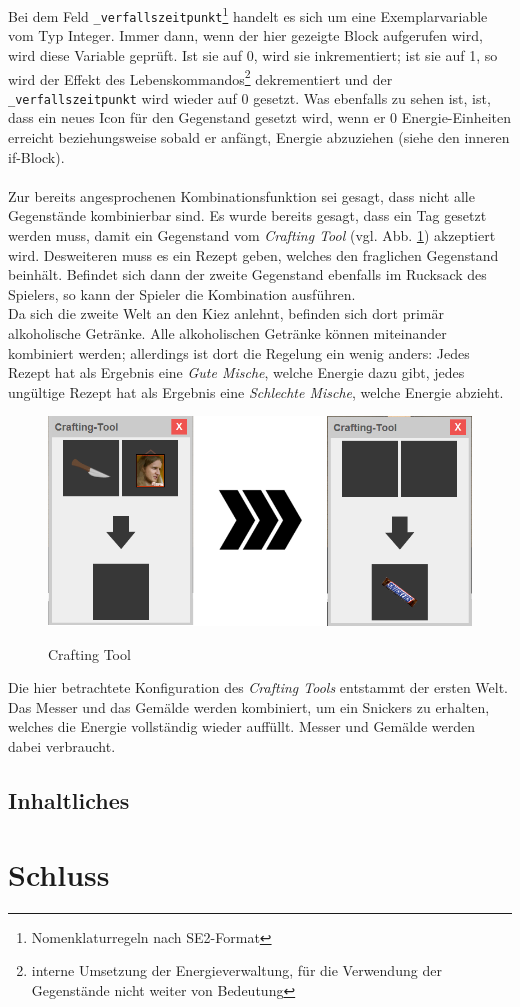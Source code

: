 \documentclass[12pt,twoside]{article}
\theoremstyle{plain}
\theoremstyle{definition}
\theoremstyle{remark}
\begin{document}
Bei dem Feld \texttt{\_verfallszeitpunkt}\footnote{Nomenklaturregeln nach SE2-Format} handelt es sich um eine Exemplarvariable vom Typ Integer.
Immer dann, wenn der hier gezeigte Block aufgerufen wird, wird diese Variable geprüft.
Ist sie auf 0, wird sie inkrementiert; ist sie auf 1, so wird der Effekt des Lebenskommandos\footnote{interne Umsetzung der Energieverwaltung, für die Verwendung der Gegenstände nicht weiter von Bedeutung} dekrementiert und der \texttt{\_verfallszeitpunkt} wird wieder auf 0 gesetzt.
Was ebenfalls zu sehen ist, ist, dass ein neues Icon für den Gegenstand gesetzt wird, wenn er 0 Energie-Einheiten erreicht beziehungsweise sobald er anfängt, Energie abzuziehen (siehe den inneren if-Block).\\
\\
Zur bereits angesprochenen Kombinationsfunktion sei gesagt, dass nicht alle Gegenstände kombinierbar sind.
Es wurde bereits gesagt, dass ein Tag gesetzt werden muss, damit ein Gegenstand vom \textit{Crafting Tool} (vgl. Abb. \ref{fig:main_craft}) akzeptiert wird.
Desweiteren muss es ein Rezept geben, welches den fraglichen Gegenstand beinhält.
Befindet sich dann der zweite Gegenstand ebenfalls im Rucksack des Spielers, so kann der Spieler die Kombination ausführen.\\
Da sich die zweite Welt an den Kiez anlehnt, befinden sich dort primär alkoholische Getränke.
Alle alkoholischen Getränke können miteinander kombiniert werden; allerdings ist dort die Regelung ein wenig anders: Jedes Rezept hat als Ergebnis eine \textit{Gute Mische}, welche Energie dazu gibt, jedes ungültige Rezept hat als Ergebnis eine \textit{Schlechte Mische}, welche Energie abzieht.
\begin{figure}[h!bt]
    \begin{center}
        \includegraphics[scale=0.5]{craftingUI.png}
        \label{fig:main_craft}
    	\caption{Crafting Tool}
    \end{center}
\end{figure}
Die hier betrachtete Konfiguration des \textit{Crafting Tools} entstammt der ersten Welt.
Das Messer und das Gemälde werden kombiniert, um ein Snickers zu erhalten, welches die Energie vollständig wieder auffüllt.
Messer und Gemälde werden dabei verbraucht.
\subsection{Inhaltliches}
\label{ssec:main_cont}


\section{Schluss}
\label{sec:end}
\end{document}

